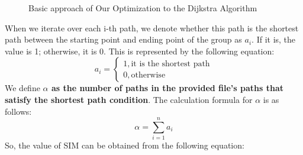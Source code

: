 \begin{figure}[H]%
    \centering
    \caption{Basic approach of Our Optimization to the Dijkstra Algorithm}
\end{figure}
\indent When we iterate over each i-th path, we denote whether this path is the shortest path between the starting point and ending point of the group as \textbf{$a_i$}. If it is, the value is 1; otherwise, it is 0. This is represented by the following equation:\\
\[%
    a_i=
    \left\{
        \begin{array}{ll}
            1, \text{it is the shortest path}\\
            0, \text{otherwise}
        \end{array}
        \right.
\]
\indent We define \textbf{$\alpha$ as the number of paths in the provided file's paths that satisfy the shortest path condition}. The calculation formula for $\alpha$ is as follows:
\begin{equation}
    \alpha=\sum_{i=1}^{n}a_i
\end{equation}
\indent  So, the value of SIM can be obtained from the following equation:
